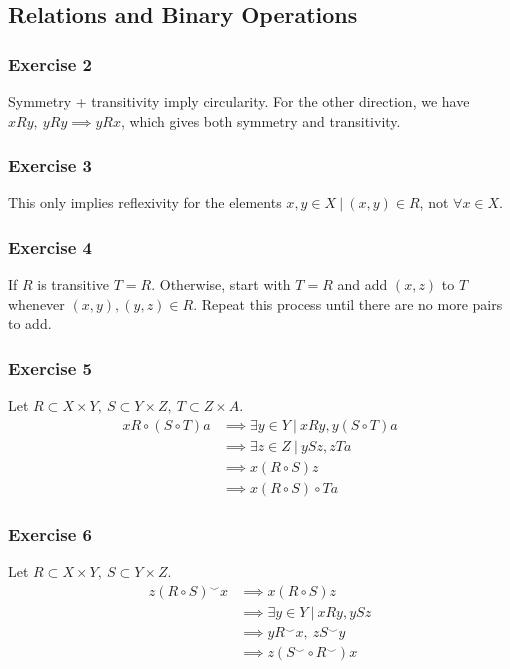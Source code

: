 \subsection{Relations and Binary Operations}

\subsubsection{Exercise 2}
Symmetry + transitivity imply circularity. 
For the other direction, we have 
$xRy, \: yRy \implies yRx$, which gives both symmetry and transitivity.

\subsubsection{Exercise 3}
This only implies reflexivity for the elements $x, y \in X \: | \: (x, y) \in R$, not $\forall x \in X$.

\subsubsection{Exercise 4}
If $R$ is transitive $T = R$. Otherwise, start with $T = R$ and add $(x, z)$ to $T$
whenever  $(x, y), (y, z) \in R$. Repeat this process until there are no more pairs to add.

\subsubsection{Exercise 5}
Let $R \subset X \times Y, \: S \subset Y \times Z, \: T \subset Z \times A$.
\begin{align*}
        x R \circ (S \circ T) a &\implies \exists y \in Y \: | \: xRy, y (S \circ T) a \\
        &\implies \exists z \in Z \: | \: ySz, zTa \\
        &\implies x (R \circ S) z \\
        &\implies x (R \circ S) \circ T a
\end{align*}

\subsubsection{Exercise 6}
Let $R \subset X \times Y, \: S \subset Y \times Z$.
\begin{align*}
        z (R \circ S)^{\smile} x &\implies x (R \circ S) z \\
                                 &\implies \exists y \in Y \: | \: xRy, ySz \\
                                 &\implies yR^{\smile} x, \:  zS^{\smile} y \\
                                 &\implies z (S^{\smile} \circ R^{\smile}) x
\end{align*}

